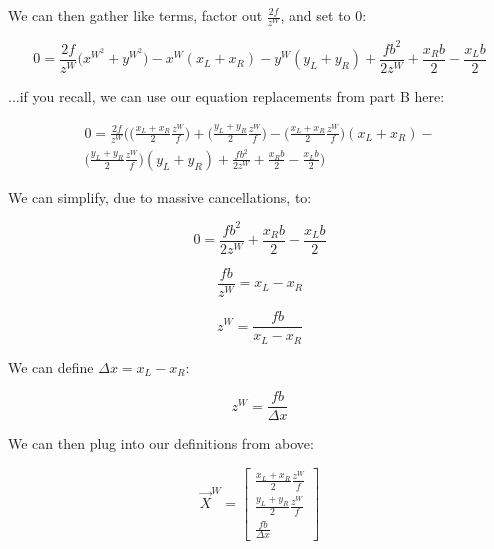 \documentclass{article}
\begin{document}
\noindent We can then gather like terms, factor out  $\frac{2f}{z^W}$, and set to 0:

\begin{equation}
    0 = \frac{2f}{z^W} \bigl(x^{W^2}+y^{W^2}\bigr)-x^W(x_L+x_R)-y^W(y_L+y_R)+\frac{fb^2}{2z^W} + \frac{x_Rb}{2}-\frac{x_Lb}{2}
\end{equation}

\noindent ...if you recall, we can use our equation replacements from part B here:

\begin{equation}
    \begin{split}
    0 = \frac{2f}{z^W} \biggl(
        \bigl(\frac{x_L+x_R}{2}\frac{z^W}{f}\bigr) + 
        \bigl(\frac{y_L+y_R}{2}\frac{z^W}{f}\bigr) -
        \bigl(\frac{x_L+x_R}{2}\frac{z^W}{f}\bigr)(x_L+x_R) -\\
        \bigl(\frac{y_L+y_R}{2}\frac{z^W}{f}\bigr)(y_L+y_R)+
        \frac{fb^2}{2z^W} + \frac{x_Rb}{2}-\frac{x_Lb}{2}
    \biggr)
    \end{split}
\end{equation}

\noindent We can simplify, due to massive cancellations, to:

\begin{equation}
    0 = \frac{fb^2}{2z^W} + \frac{x_Rb}{2}-\frac{x_Lb}{2}
\end{equation}

\begin{equation}
    \frac{fb}{z^W}=x_L-x_R
\end{equation}

\begin{equation}
    z^W = \frac{fb}{x_L-x_R}
\end{equation}

\noindent We can define $\Delta x = x_L-x_R$:

\begin{equation}
    z^W = \frac{fb}{\Delta x}
\end{equation}

\noindent We can then plug into our definitions from above:

\begin{equation}
    \vec{X}^W = \begin{bmatrix}
        \frac{x_L+x_R}{2}\frac{z^W}{f} \\
        \frac{y_L+y_R}{2}\frac{z^W}{f} \\
        \frac{fb}{\Delta x}
    \end{bmatrix}
\end{equation}
\end{document}
